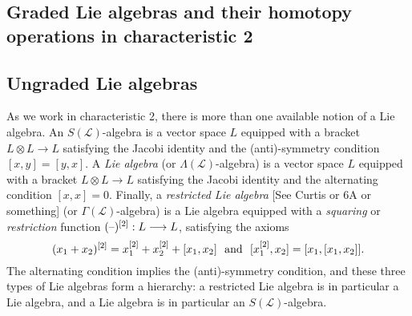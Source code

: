 \documentclass[11pt]{amsart}
\theoremstyle{plain}
\theoremstyle{definition}
\newcommand{\DASH}{\textup{--}}
\renewcommand{\to}{\longrightarrow}
\newcommand{\scrL}{\mathscr{L}}
\theoremstyle{plain}
\newcommand{\LieOperad}{{\scrL}}
\newcommand{\restn}[1]{#1^{[2]}}
\begin{document}
\begin{Lie algebras in characteristic 2 and their homotopy operations}

\section{Graded Lie algebras and their homotopy operations in characteristic 2}\label{sec on Lie algs and homotopy ops}
\subsection{Ungraded Lie algebras}
As we work in characteristic 2, there is more than one available notion of a Lie algebra. An $S(\LieOperad)$-algebra is a vector space $L$ equipped with a bracket $L\otimes L\to L$ satisfying the Jacobi identity and the (anti)-symmetry condition $[x,y]=[y,x]$. A \emph{Lie algebra} (or $\Lambda(\LieOperad)$-algebra) is a vector space $L$ equipped with a bracket $L\otimes L\to L$ satisfying the Jacobi identity and the alternating condition $[x,x]=0$. Finally, a \emph{restricted Lie algebra} [See Curtis or 6A or something] (or $\Gamma(\LieOperad)$-algebra) is a Lie algebra equipped with a \emph{squaring} or \emph{restriction} function $\restn{(\DASH)}:L\to L$, satisfying the axioms
\[\restn{(x_1+x_2)}=\restn{x_1}+\restn{x_2}+[x_1,x_2]\textup{ \ and \ }[\restn{x_1},x_2]=[x_1,[x_1,x_2]].\]
The alternating condition implies the (anti)-symmetry condition, and these three types of Lie algebras form a hierarchy: a restricted Lie algebra is in particular a Lie algebra, and a Lie algebra is in particular an $S(\LieOperad)$-algebra.


\end{Lie algebras in characteristic 2 and their homotopy operations}
\end{document}
